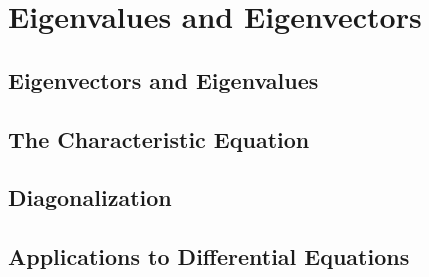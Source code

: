\documentclass[../linalg.tex]{subfiles}
\begin{document}
\chapter{Eigenvalues and Eigenvectors}
\section{Eigenvectors and Eigenvalues}
\section{The Characteristic Equation}
\section{Diagonalization}
\section{Applications to Differential Equations}
\end{document}

